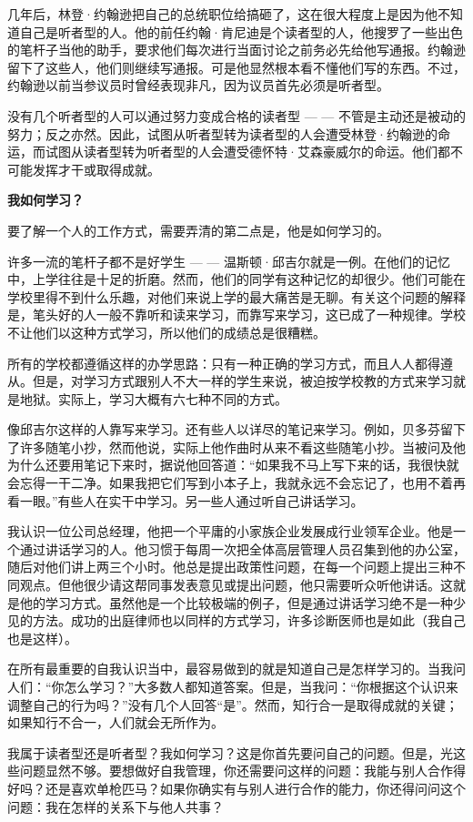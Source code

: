 \documentclass[a4paper,12pt,lang=cn,fontset = windows]{elegantpaper} %
\begin{document}
几年后，林登·约翰逊把自己的总统职位给搞砸了，这在很大程度上是因为他不知道自己是听者型的人。他的前任约翰·肯尼迪是个读者型的人，他搜罗了一些出色的笔杆子当他的助手，要求他们每次进行当面讨论之前务必先给他写通报。约翰逊留下了这些人，他们则继续写通报。可是他显然根本看不懂他们写的东西。不过，约翰逊以前当参议员时曾经表现非凡，因为议员首先必须是听者型。

没有几个听者型的人可以通过努力变成合格的读者型 — — 不管是主动还是被动的努力；反之亦然。因此，试图从听者型转为读者型的人会遭受林登·约翰逊的命运，而试图从读者型转为听者型的人会遭受德怀特·艾森豪威尔的命运。他们都不可能发挥才干或取得成就。

\textbf{我如何学习？}

要了解一个人的工作方式，需要弄清的第二点是，他是如何学习的。

许多一流的笔杆子都不是好学生 — — 温斯顿·邱吉尔就是一例。在他们的记忆中，上学往往是十足的折磨。然而，他们的同学有这种记忆的却很少。他们可能在学校里得不到什么乐趣，对他们来说上学的最大痛苦是无聊。有关这个问题的解释是，笔头好的人一般不靠听和读来学习，而靠写来学习，这已成了一种规律。学校不让他们以这种方式学习，所以他们的成绩总是很糟糕。

所有的学校都遵循这样的办学思路：只有一种正确的学习方式，而且人人都得遵从。但是，对学习方式跟别人不大一样的学生来说，被迫按学校教的方式来学习就是地狱。实际上，学习大概有六七种不同的方式。

像邱吉尔这样的人靠写来学习。还有些人以详尽的笔记来学习。例如，贝多芬留下了许多随笔小抄，然而他说，实际上他作曲时从来不看这些随笔小抄。当被问及他为什么还要用笔记下来时，据说他回答道：“如果我不马上写下来的话，我很快就会忘得一干二净。如果我把它们写到小本子上，我就永远不会忘记了，也用不着再看一眼。”有些人在实干中学习。另一些人通过听自己讲话学习。

我认识一位公司总经理，他把一个平庸的小家族企业发展成行业领军企业。他是一个通过讲话学习的人。他习惯于每周一次把全体高层管理人员召集到他的办公室，随后对他们讲上两三个小时。他总是提出政策性问题，在每一个问题上提出三种不同观点。但他很少请这帮同事发表意见或提出问题，他只需要听众听他讲话。这就是他的学习方式。虽然他是一个比较极端的例子，但是通过讲话学习绝不是一种少见的方法。成功的出庭律师也以同样的方式学习，许多诊断医师也是如此（我自己也是这样）。

在所有最重要的自我认识当中，最容易做到的就是知道自己是怎样学习的。当我问人们：“你怎么学习？”大多数人都知道答案。但是，当我问：“你根据这个认识来调整自己的行为吗？”没有几个人回答“是”。然而，知行合一是取得成就的关键；如果知行不合一，人们就会无所作为。

我属于读者型还是听者型？我如何学习？这是你首先要问自己的问题。但是，光这些问题显然不够。要想做好自我管理，你还需要问这样的问题：我能与别人合作得好吗？还是喜欢单枪匹马？如果你确实有与别人进行合作的能力，你还得问问这个问题：我在怎样的关系下与他人共事？
\end{document}
